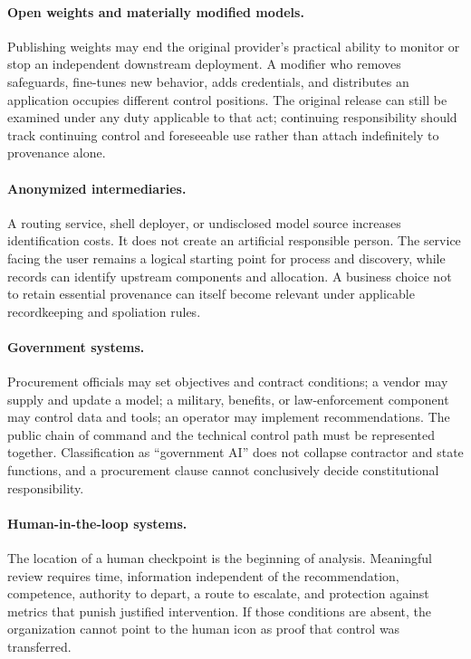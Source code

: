 \paragraph{Open weights and materially modified models.}
Publishing weights may end the original provider's practical ability to monitor or stop an independent downstream deployment. A modifier who removes safeguards, fine-tunes new behavior, adds credentials, and distributes an application occupies different control positions. The original release can still be examined under any duty applicable to that act; continuing responsibility should track continuing control and foreseeable use rather than attach indefinitely to provenance alone.

\paragraph{Anonymized intermediaries.}
A routing service, shell deployer, or undisclosed model source increases identification costs. It does not create an artificial responsible person. The service facing the user remains a logical starting point for process and discovery, while records can identify upstream components and allocation. A business choice not to retain essential provenance can itself become relevant under applicable recordkeeping and spoliation rules.

\paragraph{Government systems.}
Procurement officials may set objectives and contract conditions; a vendor may supply and update a model; a military, benefits, or law-enforcement component may control data and tools; an operator may implement recommendations. The public chain of command and the technical control path must be represented together. Classification as ``government AI'' does not collapse contractor and state functions, and a procurement clause cannot conclusively decide constitutional responsibility.

\paragraph{Human-in-the-loop systems.}
The location of a human checkpoint is the beginning of analysis. Meaningful review requires time, information independent of the recommendation, competence, authority to depart, a route to escalate, and protection against metrics that punish justified intervention. If those conditions are absent, the organization cannot point to the human icon as proof that control was transferred.

